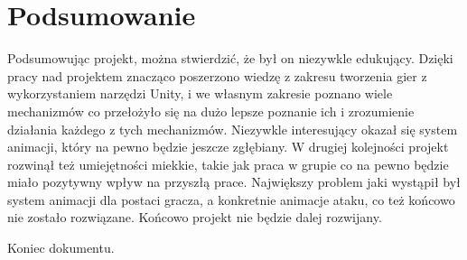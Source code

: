 \documentclass[10pt,a4paper]{article}
\begin{document}
\section{Podsumowanie}
Podsumowując projekt, można stwierdzić, że był on niezywkle edukujący. Dzięki pracy nad projektem znacząco poszerzono wiedzę z zakresu tworzenia gier z wykorzystaniem narzędzi Unity, i we własnym zakresie poznano wiele mechanizmów co przełożyło się na dużo lepsze poznanie ich i zrozumienie działania każdego z tych mechanizmów. Niezywkle interesujący okazał się system animacji, który na pewno będzie jeszcze zgłębiany. W drugiej kolejności projekt rozwinął też umiejętności miekkie, takie jak praca w grupie co na pewno będzie miało pozytywny wpływ na przyszłą prace. Największy problem jaki wystąpił był system animacji dla postaci gracza, a konkretnie animacje ataku, co też końcowo nie zostało rozwiązane. Końcowo projekt nie będzie dalej rozwijany.


\noindent\makebox[\linewidth]{\rule{0.6\paperwidth}{0.4pt}}
\begin{center}
	Koniec dokumentu.
\end{center}
\end{document}
